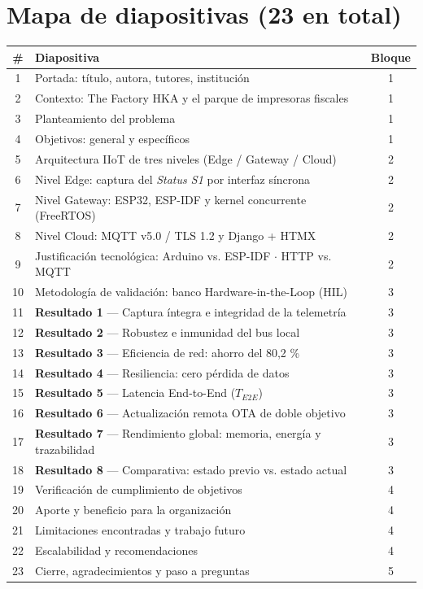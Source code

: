 \documentclass[11pt, a4paper]{article}
\begin{document}
\section*{Mapa de diapositivas (23 en total)}

\begin{table}[htbp]
\centering
\small
\begin{tabularx}{\textwidth}{c X c}
\toprule
\textbf{\#} & \textbf{Diapositiva} & \textbf{Bloque} \\
\midrule
1 & Portada: título, autora, tutores, institución & 1 \\
2 & Contexto: The Factory HKA y el parque de impresoras fiscales & 1 \\
3 & Planteamiento del problema & 1 \\
4 & Objetivos: general y específicos & 1 \\
5 & Arquitectura IIoT de tres niveles (Edge / Gateway / Cloud) & 2 \\
6 & Nivel Edge: captura del \textit{Status S1} por interfaz síncrona & 2 \\
7 & Nivel Gateway: ESP32, ESP-IDF y kernel concurrente (FreeRTOS) & 2 \\
8 & Nivel Cloud: MQTT v5.0 / TLS 1.2 y Django + HTMX & 2 \\
9 & Justificación tecnológica: Arduino vs. ESP-IDF $\cdot$ HTTP vs. MQTT & 2 \\
10 & Metodología de validación: banco Hardware-in-the-Loop (HIL) & 3 \\
11 & \textbf{Resultado 1} — Captura íntegra e integridad de la telemetría & 3 \\
12 & \textbf{Resultado 2} — Robustez e inmunidad del bus local & 3 \\
13 & \textbf{Resultado 3} — Eficiencia de red: ahorro del 80,2 \% & 3 \\
14 & \textbf{Resultado 4} — Resiliencia: cero pérdida de datos & 3 \\
15 & \textbf{Resultado 5} — Latencia End-to-End ($T_{E2E}$) & 3 \\
16 & \textbf{Resultado 6} — Actualización remota OTA de doble objetivo & 3 \\
17 & \textbf{Resultado 7} — Rendimiento global: memoria, energía y trazabilidad & 3 \\
18 & \textbf{Resultado 8} — Comparativa: estado previo vs. estado actual & 3 \\
19 & Verificación de cumplimiento de objetivos & 4 \\
20 & Aporte y beneficio para la organización & 4 \\
21 & Limitaciones encontradas y trabajo futuro & 4 \\
22 & Escalabilidad y recomendaciones & 4 \\
23 & Cierre, agradecimientos y paso a preguntas & 5 \\
\bottomrule
\end{tabularx}
\end{table}
\end{document}
